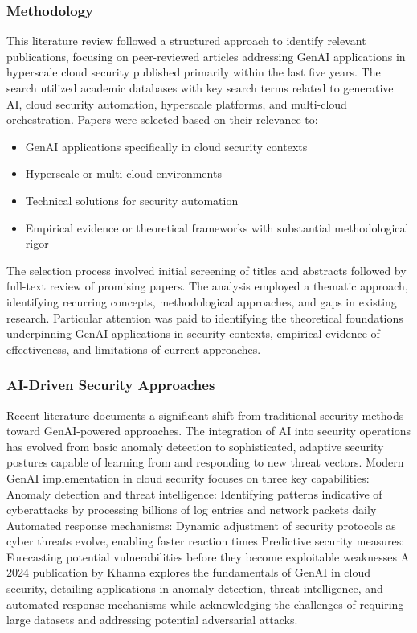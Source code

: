 \subsubsection{Methodology} %
\label{sec:Methodology}

This literature review followed a structured approach to identify relevant publications, focusing on peer-reviewed articles addressing GenAI applications in hyperscale cloud security published primarily within the last five years. The search utilized academic databases with key search terms related to generative AI, cloud security automation, hyperscale platforms, and multi-cloud orchestration.
Papers were selected based on their relevance to:

\begin{itemize}
\item GenAI applications specifically in cloud security contexts
\item Hyperscale or multi-cloud environments
\item Technical solutions for security automation
\item Empirical evidence or theoretical frameworks with substantial methodological rigor
\end{itemize}

The selection process involved initial screening of titles and abstracts followed by full-text review of promising papers. The analysis employed a thematic approach, identifying recurring concepts, methodological approaches, and gaps in existing research. Particular attention was paid to identifying the theoretical foundations underpinning GenAI applications in security contexts, empirical evidence of effectiveness, and limitations of current approaches.


\subsubsection{AI-Driven Security Approaches} %
\label{sec:AI-Driven Security Approaches}

Recent literature documents a significant shift from traditional security methods toward GenAI-powered approaches. The integration of AI into security operations has evolved from basic anomaly detection to sophisticated, adaptive security postures capable of learning from and responding to new threat vectors.
Modern GenAI implementation in cloud security focuses on three key capabilities:
Anomaly detection and threat intelligence: Identifying patterns indicative of cyberattacks by processing billions of log entries and network packets daily
Automated response mechanisms: Dynamic adjustment of security protocols as cyber threats evolve, enabling faster reaction times
Predictive security measures: Forecasting potential vulnerabilities before they become exploitable weaknesses
A 2024 publication by Khanna explores the fundamentals of GenAI in cloud security, detailing applications in anomaly detection, threat intelligence, and automated response mechanisms while acknowledging the challenges of requiring large datasets and addressing potential adversarial attacks.

